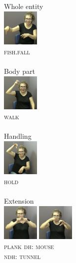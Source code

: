 \documentclass[]{elsarticle} %
\begin{document}
\begin{multicols}{4}
\begin{exe}
\ex \label{ex:8}
\begin{xlist}
\ex Whole entity \\\glll 
\includegraphics[width=50pt]{pictures/3e.png} \\ \textsc{fish.fall}\\ \\
\ex Body part \\\glll
\includegraphics[width=50pt]{pictures/3b.png} \\ \textsc{walk} \\ \\ 
\ex Handling \\\glll 
\includegraphics[width=50pt]{pictures/3c.png} \\ \textsc{hold} \\ \\
\ex Extension \\\glll 
\includegraphics[width=50pt]{pictures/3d_1.png} \includegraphics[width=50pt]{pictures/3a.png}\\ \textsc{plank} {\textsc{dh: mouse}} \\ {} {\textsc{ndh: tunnel}}\\ \\
\end{xlist}
\end{exe}
\end{multicols}
\end{document}
